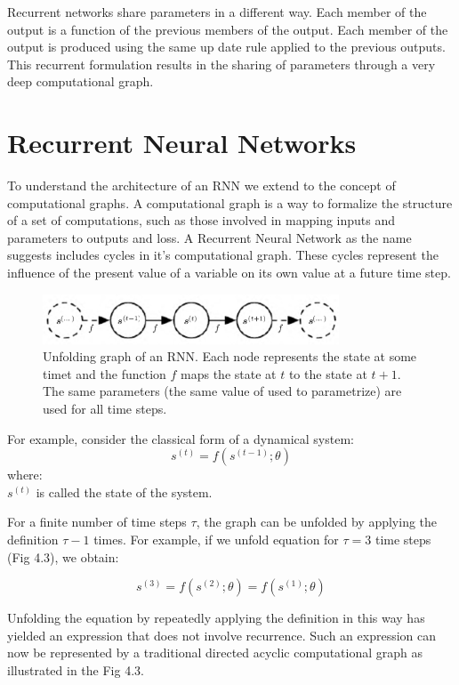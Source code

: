 \documentclass{report}
\begin{document}
Recurrent networks share parameters in a different way. Each member of the output is a function of the previous members of the output. Each member of the output is produced using the same up date rule applied to the previous outputs. This recurrent formulation results in the sharing of parameters through a very deep computational graph.

\section{Recurrent Neural Networks}

To understand the architecture of an RNN we extend to the concept of computational graphs. A computational graph is a way to formalize the structure of a set of computations, such as those involved in mapping inputs and parameters to outputs and loss. A Recurrent Neural Network as the name suggests includes cycles in it's computational graph. These cycles represent the influence of the present value of a variable on its own value at a future time step. 

\begin{figure}[ht]
	\includegraphics[width=250pt]{34}
	\centering
	\caption{Unfolding graph of an RNN. Each node represents the state at some timet and the function $f$ maps the state at $t$ to the state at $t + 1$. The same parameters (the same value of used to parametrize) are used for all time steps.}
\end{figure}

For example, consider the classical form of a dynamical system:
$$s^{(t)} = f(s^{(t-1)}; \theta)$$
where: \\ 
$s^{(t)}$ is called the state of the system.

For a finite number of time steps $\tau$, the graph can be unfolded by applying the definition $\tau - 1$ times. For example, if we unfold equation for $\tau=3$ time steps (Fig 4.3), we obtain:

$$s^{(3)} = f(s^{(2)}; \theta) = f(s^{(1)}; \theta) $$

Unfolding the equation by repeatedly applying the definition in this way has yielded an expression that does not involve recurrence. Such an expression can now be represented by a traditional directed acyclic computational graph as illustrated in the Fig 4.3.
\end{document}
